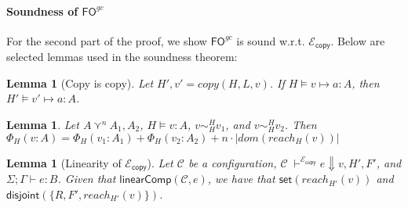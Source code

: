 \documentclass{easychair}
\newcommand{\ms}[1]{\ensuremath{\mathsf{#1}}}
\newcommand{\stable}[1]{\mathsf{stable}(#1)}
\newcommand{\dist}[1]{\mathsf{disjoint}(#1)}
\newcommand{\linearComp}[2]{\mathsf{linearComp}(#1,#2)}
\newcommand{\veq}[4]{#3 \sim^{#1}_{#2} #4}
\newcommand{\fogc}{\ms{FO}^{gc}}
\newcommand{\copySem}{\ensuremath{\mathcal{E}_{\ms{copy}}}}
\newtheorem{lemma}[theorem]{Lemma}
\theoremstyle{definition}
\newtheorem{definition}{Definition}
\begin{document}
\paragraph{Soundness of $\fogc$}
\label{sect:soundcopy}
For the second part of the proof, we show $\fogc$ is sound w.r.t. \copySem{}. Below
are selected lemmas used in the soundness theorem:

\iffalse
\begin{lemma}\label{itm:wellFormed}
	Let $H \vDash V : \Gamma$, $\Sigma;\Gamma \vdash e : A$, and $V,H \vdash e \Downarrow v,H'$. Then 
	$H' \vDash v : A$.
      \end{lemma}
      \fi
      


\iffalse
 \begin{definition}[Stability]
Given heaps $H,H'$, a set of locations is \emph{stable} if $\forall l \in R$. $H(l) = H'(l)$. Denote this by
$\stable{R,H,H'}$.
\end{definition}

\begin{lemma}\label{itm:stable}
Let $H \vDash v \mapsto a : A$. For all sets of locations $R$, if $reach_H(v) \subseteq R$ and $\stable{R,H,H'}$, then $H' \vDash v \mapsto a : A$ and $reach_H(v) = reach_{H'}(v)$.
\end{lemma}


\begin{lemma}[Stability of copying]\label{itm:copyStable}
	Let $H',v' = copy(H,L,v)$. For all $l \in H$, if $l \notin L$, then $H(l) = H'(l)$. 
	Further, $reach_{H'}(v') \subseteq L$.
      \end{lemma}
      \fi

\begin{lemma}[Copy is copy]
	Let $H',v' = copy(H,L,v)$. If $H \vDash v \mapsto a : A$, then $H' \vDash v' \mapsto a : A$.
\end{lemma}

\begin{lemma}\label{itm:shareSize}
	Let $A \curlyvee^n A_1,A_2$, $H \vDash v : A$, 
  $\veq{H}{H}{v}{v_1}$, and $\veq{H}{H}{v}{v_2}$. Then $\Phi_{H}(v : A) = 
	\Phi_{H}(v_1 : A_1) + \Phi_{H}(v_2 : A_2) + n\cdot |dom(reach_H(v))|$
\end{lemma}

\begin{lemma}[Linearity of \copySem{}]\label{itm:na}
  Let $\mathcal{C}$ be a configuration, $\mathcal{C} \; \vdash^{\copySem{}} e \Downarrow v, H', F'$, and
  $\Sigma; \Gamma \vdash e : B$. Given that $\linearComp{\mathcal{C}}{e}$,
  we have that $\ms{set}(reach_{H'}(v))$ and $\dist{\{R,F',reach_{H'}(v)\}}$.
\end{lemma}
\end{document}
